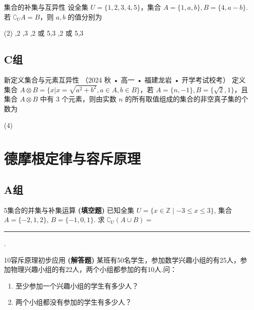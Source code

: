 \begin{choice}{}{集合的补集与互异性}
	设全集 $U=\{1,2,3,4,5\}$，集合 $A=\{1,a,b\}, B=\{4, a-b\}$.若 $\complement_U A = B$，则 $a,b$ 的值分别为
	\begin{tasks}(2)
		,2
		,3
		,2 或 5,3
		,2 或 5,3
	\end{tasks}
\end{choice}

\subsection*{C组}

\begin{choice}{}{新定义集合与元素互异性}
	{（2024 秋 • 高一 • 福建龙岩 • 开学考试校考）} 定义集合 $A \otimes B = \{x | x=\sqrt{a^2+b^2}, a \in A, b \in B\}$，若 $A=\{n, -1\}, B=\{\sqrt{2}, 1\}$，且集合 $A \otimes B$ 中有 3 个元素，则由实数 $n$ 的所有取值组成的集合的非空真子集的个数为
	\begin{tasks}(4)
	\end{tasks}
\end{choice}

\stopexercise

\section{德摩根定律与容斥原理}

\startexercise

\subsection*{A组}

\begin{exercise}{5}{集合的并集与补集运算}
	\textbf{(填空题)} 已知全集 $U=\{x \in \mathbb{Z} \mid -3 \le x \le 3\}$, 集合 $A=\{-2, 1, 2\}$, $B=\{-1, 0, 1\}$. 求 $\complement_U(A \cup B) = $ \rule{3cm}{0.5pt}.
\end{exercise}

\begin{exercise}{10}{容斥原理初步应用}
	\textbf{(解答题)} 某班有50名学生，参加数学兴趣小组的有25人，参加物理兴趣小组的有22人，两个小组都参加的有10人.问：
	\begin{enumerate}
		\item 至少参加一个兴趣小组的学生有多少人？
		\item 两个小组都没有参加的学生有多少人？
	\end{enumerate}
\end{exercise}

